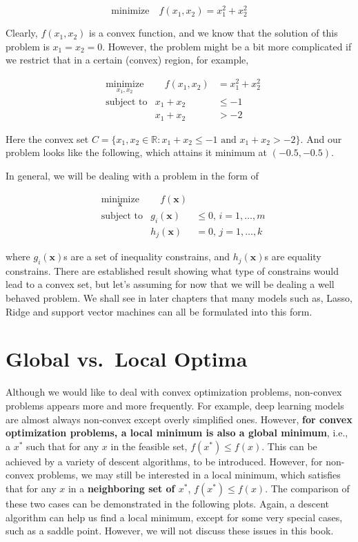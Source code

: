 \documentclass[
]{book}
\theoremstyle{definition}
\theoremstyle{definition}
\theoremstyle{definition}
\theoremstyle{definition}
\theoremstyle{remark}
\begin{document}
\[ \text{minimize} \quad f(x_1, x_2) = x_1^2 + x_2^2\]

Clearly, \(f(x_1, x_2)\) is a convex function, and we know that the solution of this problem is \(x_1 = x_2 = 0\). However, the problem might be a bit more complicated if we restrict that in a certain (convex) region, for example,

\begin{align}
&\underset{x_1, x_2}{\text{minimize}} & \quad f(x_1, x_2) &= x_1^2 + x_2^2 \\
&\text{subject to} & x_1 + x_2 &\leq -1 \\
& & x_1 + x_2 &> -2
\end{align}

Here the convex set \(C = \{x_1, x_2 \in \mathbb{R}: x_1 + x_2 \leq -1 \,\, \text{and} \,\, x_1 + x_2 > -2\}\). And our problem looks like the following, which attains it minimum at \((-0.5, -0.5)\).

In general, we will be dealing with a problem in the form of

\begin{align}
&\underset{\mathbf{x}}{\text{minimize}} & \quad f(\mathbf{x}) \\
&\text{subject to} & g_i(\mathbf{x}) & \leq 0, \, i = 1,\ldots, m \\
& & h_j(\mathbf{x}) &= 0, \, j = 1,\ldots, k
\end{align}

where \(g_i(\mathbf{x})\)s are a set of inequality constrains, and \(h_j(\mathbf{x})\)s are equality constrains. There are established result showing what type of constrains would lead to a convex set, but let's assuming for now that we will be dealing a well behaved problem. We shall see in later chapters that many models such as, Lasso, Ridge and support vector machines can all be formulated into this form.

\hypertarget{global_local}{%
\section{Global vs.~Local Optima}\label{global_local}}

Although we would like to deal with convex optimization problems, non-convex problems appears more and more frequently. For example, deep learning models are almost always non-convex except overly simplified ones. However, \textbf{for convex optimization problems, a local minimum is also a global minimum}, i.e., a \(x^\ast\) such that for any \(x\) in the feasible set, \(f(x^\ast) \leq f(x)\). This can be achieved by a variety of descent algorithms, to be introduced. However, for non-convex problems, we may still be interested in a local minimum, which satisfies that for any \(x\) in a \textbf{neighboring set of \(x^\ast\)}, \(f(x^\ast) \leq f(x)\). The comparison of these two cases can be demonstrated in the following plots. Again, a descent algorithm can help us find a local minimum, except for some very special cases, such as a saddle point. However, we will not discuss these issues in this book.
\end{document}
